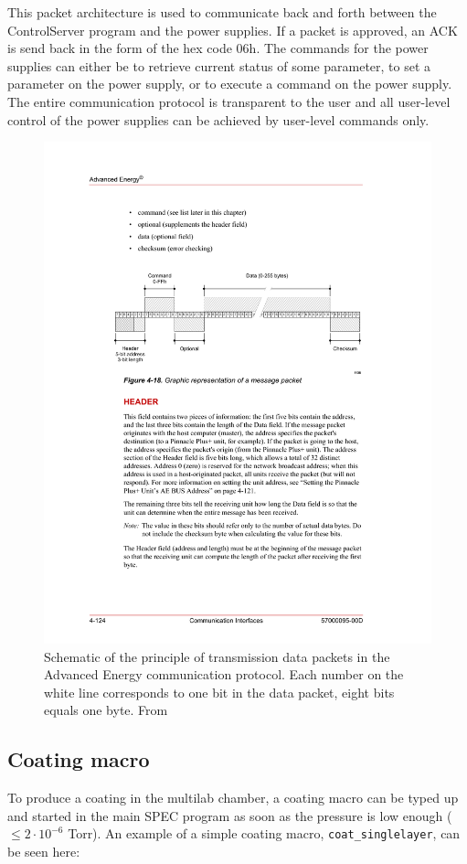 This packet architecture is used to communicate back and forth between the ControlServer program and the power supplies. If a packet is approved, an ACK is send back in the form of the hex code 06h. The commands for the power supplies can either be to retrieve current status of some parameter, to set a parameter on the power supply, or to execute a command on the power supply. The entire communication protocol is transparent to the user and all user-level control of the power supplies can be achieved by user-level commands only.

\begin{figure}[!h]
  \center
  \includegraphics[width=0.9\linewidth]{figures/chamber/ae_packet.pdf}
\caption{\footnotesize Schematic of the principle of transmission data packets in the Advanced Energy communication protocol. Each number on the white line corresponds to one bit in the data packet, eight bits equals one byte. From \cite{Anonymous:zazNQqcS}}\label{fig:ae_packet}
\end{figure}

\subsection{Coating macro}
To produce a coating in the multilab chamber, a coating macro can be typed up and started in the main SPEC program as soon as the pressure is low enough ($\leq2\cdot10^{-6}$ Torr). An example of a simple coating macro, \verb'coat_singlelayer', can be seen here:

